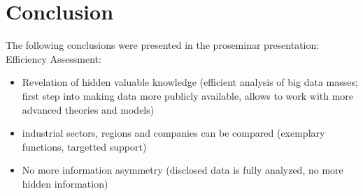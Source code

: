 \chapter{Conclusion}
\label{cha:conclusion}







The following conclusions were presented in the proseminar presentation:
Efficiency Assessment:
\begin{itemize}
    \item Revelation of hidden valuable knowledge (efficient analysis of big data masses; first step into making data more publicly available, allows to work with more advanced theories and models)
    \item industrial sectors, regions and companies can be compared (exemplary functions, targetted support)
    \item No more information asymmetry (disclosed data is fully analyzed, no more hidden information)
\end{itemize}

